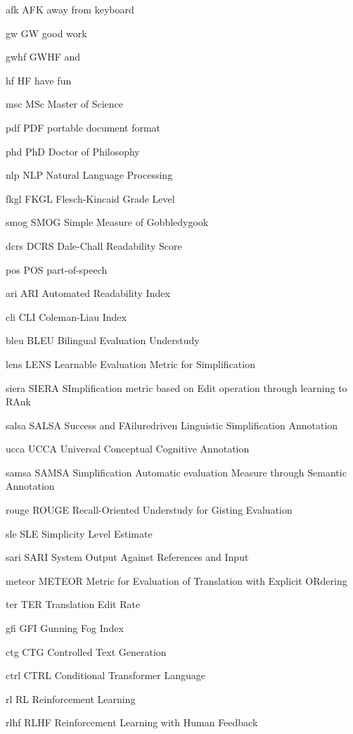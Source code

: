 \newabbreviation
{afk}
{AFK}
{away from keyboard}

\newabbreviation
{gw}
{GW}
{good work}

\newabbreviation
{gwhf}
{GWHF}
{ and }

\newabbreviation
{hf}
{HF}
{have fun}

\newabbreviation
{msc}
{MSc}
{Master of Science}

\newabbreviation
{pdf}
{PDF}
{portable document format}

\newabbreviation
{phd}
{PhD}
{Doctor of Philosophy}

\newabbreviation
{nlp}
{NLP}
{Natural Language Processing}

\newabbreviation
{fkgl}
{FKGL}
{Flesch-Kincaid Grade Level}

\newabbreviation
{smog}
{SMOG}
{Simple Measure of Gobbledygook}

\newabbreviation
{dcrs}
{DCRS}
{Dale-Chall Readability Score}

\newabbreviation
{pos}
{POS}
{part-of-speech}

\newabbreviation
{ari}
{ARI}
{Automated Readability Index}

\newabbreviation
{cli}
{CLI}
{Coleman-Liau Index}

\newabbreviation
{bleu}
{BLEU}
{Bilingual Evaluation Understudy}

\newabbreviation
{lens}
{LENS}
{Learnable Evaluation Metric for Simplification}

\newabbreviation
{siera}
{SIERA}
{SImplification metric based on Edit operation through learning to RAnk}

\newabbreviation
{salsa}
{SALSA}
{Success and FAiluredriven Linguistic Simplification Annotation}

\newabbreviation
{ucca}
{UCCA}
{Universal Conceptual Cognitive Annotation}

\newabbreviation
{samsa}
{SAMSA}
{Simplification Automatic evaluation Measure through Semantic Annotation}

\newabbreviation
{rouge}
{ROUGE}
{Recall-Oriented Understudy for Gisting Evaluation}

\newabbreviation
{sle}
{SLE}
{Simplicity Level Estimate}

\newabbreviation
{sari}
{SARI}
{System Output Against References and Input}

\newabbreviation
{meteor}
{METEOR}
{Metric for Evaluation of Translation with Explicit ORdering}

\newabbreviation
{ter}
{TER}
{Translation Edit Rate}

\newabbreviation
{gfi}
{GFI}
{Gunning Fog Index}

\newabbreviation
{ctg}
{CTG}
{Controlled Text Generation}

\newabbreviation
{ctrl}
{CTRL}
{Conditional Transformer Language}

\newabbreviation
{rl}
{RL}
{Reinforcement Learning}

\newabbreviation
{rlhf}
{RLHF}
{Reinforcement Learning with Human Feedback}